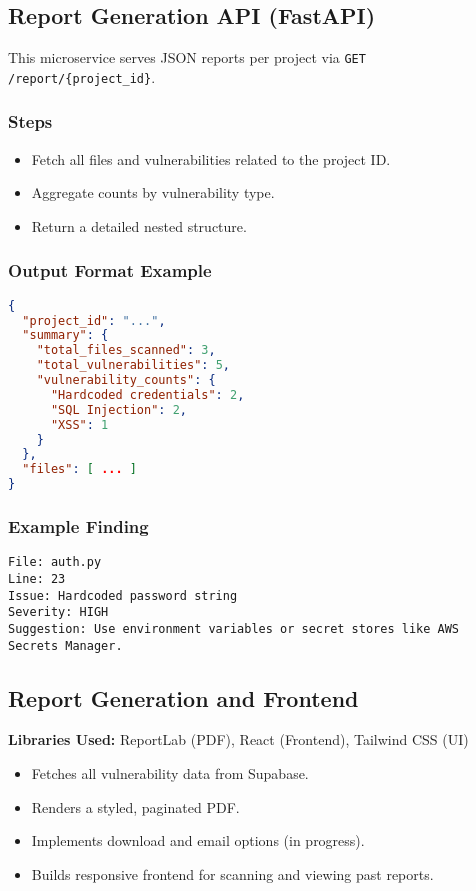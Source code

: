 \documentclass{article}
\begin{document}
\subsection{Report Generation API (FastAPI)}
This microservice serves JSON reports per project via \texttt{GET /report/\{project\_id\}}.

\subsubsection{Steps}
\begin{itemize}
    \item Fetch all files and vulnerabilities related to the project ID.
    \item Aggregate counts by vulnerability type.
    \item Return a detailed nested structure.
\end{itemize}

\subsubsection{Output Format Example}
\begin{lstlisting}[language=json]
{
  "project_id": "...",
  "summary": {
    "total_files_scanned": 3,
    "total_vulnerabilities": 5,
    "vulnerability_counts": {
      "Hardcoded credentials": 2,
      "SQL Injection": 2,
      "XSS": 1
    }
  },
  "files": [ ... ]
}
\end{lstlisting}

\subsubsection{Example Finding}
\begin{verbatim}
File: auth.py
Line: 23
Issue: Hardcoded password string
Severity: HIGH
Suggestion: Use environment variables or secret stores like AWS Secrets Manager.
\end{verbatim}

\subsection{Report Generation and Frontend}
\textbf{Libraries Used:} ReportLab (PDF), React (Frontend), Tailwind CSS (UI)

\begin{itemize}
    \item Fetches all vulnerability data from Supabase.
    \item Renders a styled, paginated PDF.
    \item Implements download and email options (in progress).
    \item Builds responsive frontend for scanning and viewing past reports.
\end{itemize}
\end{document}
